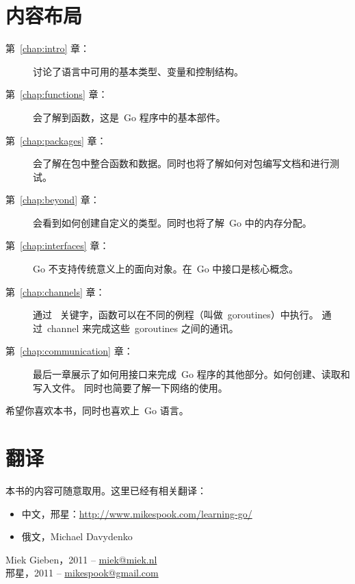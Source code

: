 \section*{内容布局}
\begin{description}
\item[第~\ref{chap:intro} 章：]
讨论了语言中可用的基本类型、变量和控制结构。

\item[第~\ref{chap:functions} 章：]
会了解到函数，这是~Go 程序中的基本部件。

\item[第~\ref{chap:packages} 章：]
会了解在包中整合函数和数据。同时也将了解如何对包编写文档和进行测试。

\item[第~\ref{chap:beyond} 章：]
会看到如何创建自定义的类型。同时也将了解~Go 中的内存分配。

\item[第~\ref{chap:interfaces} 章：]
Go 不支持传统意义上的面向对象。在~Go 中接口是核心概念。

\item[第~\ref{chap:channels} 章：]
通过~ 关键字，函数可以在不同的例程（叫做~goroutines）中执行。
通过~channel 来完成这些~goroutines 之间的通讯。

\item[第~\ref{chap:communication} 章：]
最后一章展示了如何用接口来完成~Go 程序的其他部分。如何创建、读取和写入文件。
同时也简要了解一下网络的使用。
\end{description}

希望你喜欢本书，同时也喜欢上~Go 语言。

\section*{翻译}
本书的内容可随意取用。这里已经有相关翻译：
\begin{itemize}
\item 中文，邢星：\url{http://www.mikespook.com/learning-go/}
\item 俄文，Michael Davydenko
\end{itemize}

\begin{raggedright}
Miek Gieben，2011 -- \url{miek@miek.nl}\\
邢星，2011 -- \url{mikespook@gmail.com}
\end{raggedright}
